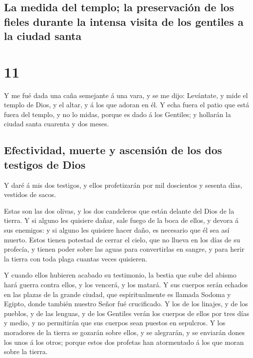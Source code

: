 \hypertarget{la-medida-del-templo-la-preservaciuxf3n-de-los-fieles-durante-la-intensa-visita-de-los-gentiles-a-la-ciudad-santa}{%
\subsection{La medida del templo; la preservación de los fieles durante
la intensa visita de los gentiles a la ciudad
santa}\label{la-medida-del-templo-la-preservaciuxf3n-de-los-fieles-durante-la-intensa-visita-de-los-gentiles-a-la-ciudad-santa}}

\hypertarget{section-10}{%
\section{11}\label{section-10}}

 Y me fué dada una caña semejante á una vara, y se me dijo:
Levántate, y mide el templo de Dios, y el altar, y á los que adoran en
él.  Y echa fuera el patio que está fuera del templo, y no
lo midas, porque es dado á los Gentiles; y hollarán la ciudad santa
cuarenta y dos meses.

\hypertarget{efectividad-muerte-y-ascensiuxf3n-de-los-dos-testigos-de-dios}{%
\subsection{Efectividad, muerte y ascensión de los dos testigos de
Dios}\label{efectividad-muerte-y-ascensiuxf3n-de-los-dos-testigos-de-dios}}

 Y daré á mis dos testigos, y ellos profetizarán por mil
doscientos y sesenta días, vestidos de sacos.

 Estas son las dos olivas, y los dos candeleros que están
delante del Dios de la tierra.  Y si alguno les quisiere
dañar, sale fuego de la boca de ellos, y devora á sus enemigos: y si
alguno les quisiere hacer daño, es necesario que él sea así muerto.
 Estos tienen potestad de cerrar el cielo, que no llueva en
los días de su profecía, y tienen poder sobre las aguas para
convertirlas en sangre, y para herir la tierra con toda plaga cuantas
veces quisieren.

 Y cuando ellos hubieren acabado su testimonio, la bestia
que sube del abismo hará guerra contra ellos, y los vencerá, y los
matará.  Y sus cuerpos serán echados en las plazas de la
grande ciudad, que espiritualmente es llamada Sodoma y Egipto, donde
también nuestro Señor fué crucificado.  Y los de los
linajes, y de los pueblos, y de las lenguas, y de los Gentiles verán los
cuerpos de ellos por tres días y medio, y no permitirán que sus cuerpos
sean puestos en sepulcros.  Y los moradores de la tierra se
gozarán sobre ellos, y se alegrarán, y se enviarán dones los unos á los
otros; porque estos dos profetas han atormentado á los que moran sobre
la tierra.

